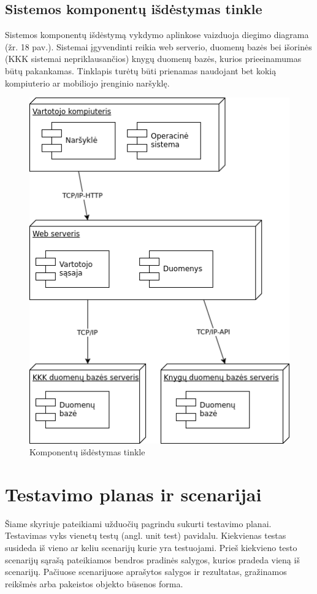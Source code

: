 \documentclass{VUMIFPSkursinis}
\begin{document}
	\subsection{Sistemos komponentų išdėstymas tinkle}
		Sistemos komponentų išdėstymą vykdymo aplinkose vaizduoja diegimo diagrama (žr. 18 pav.).
		Sistemai įgyvendinti reikia web serverio, duomenų bazės bei išorinės (KKK sistemai nepriklausančios) 
		knygų duomenų bazės, kurios prieeinamumas būtų pakankamas.
		Tinklapis turėtų būti prienamas naudojant bet kokią kompiuterio ar mobiliojo įrenginio naršyklę.
		\begin{figure}[H]
			\centering
			\includegraphics[scale=0.9]{img/Deployment.png}
			\caption{Komponentų išdėstymas tinkle}
			\label{img:psi2-deployment}
		\end{figure}

\section{Testavimo planas ir scenarijai}
	Šiame skyriuje pateikiami užduočių pagrindu sukurti testavimo planai.
	Testavimas vyks vienetų testų (angl. unit test) pavidalu.
	Kiekvienas testas susideda iš vieno ar keliu scenarijų kurie yra testuojami.
	Prieš kiekvieno testo scenarijų sąrašą pateikiamos bendros pradinės salygos, 
	kurios pradeda vieną iš scenarijų. Pačiuose scenarijuose aprašytos salygos ir rezultatas, 
	gražinamos reikšmės arba pakeistos objekto būsenos forma.
\end{document}
